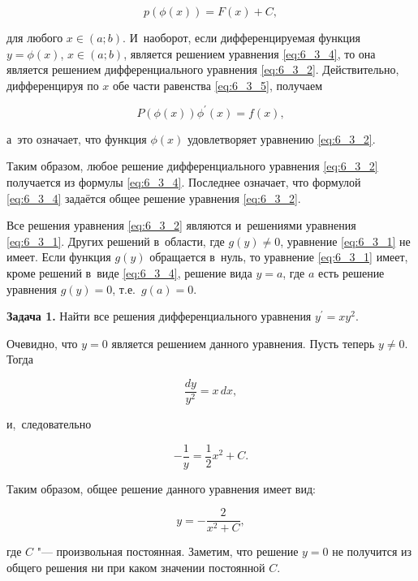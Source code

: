 \begin{equation}\label{eq:6_3_5}
p(\phi(x)) = F(x) + C,
\end{equation}

\noindent
для любого $x \in (a; b)$. И~наоборот, если дифференцируемая функция $y = \phi(x)$,
$x \in (a; b)$, является решением уравнения \eqref{eq:6_3_4}, то она является
решением дифференциального уравнения \eqref{eq:6_3_2}.
Действительно, дифференцируя по $x$ обе части равенства \eqref{eq:6_3_5},
получаем

\begin{equation*}
P(\phi(x)) \phi^\prime(x) = f(x),
\end{equation*}

\noindent
а~это означает, что функция $\phi(x)$ удовлетворяет уравнению \eqref{eq:6_3_2}.

Таким образом, любое решение дифференциального уравнения \eqref{eq:6_3_2} получается
из формулы \eqref{eq:6_3_4}. Последнее означает, что формулой \eqref{eq:6_3_4}
задаётся общее решение уравнения \eqref{eq:6_3_2}.

Все решения уравнения \eqref{eq:6_3_2} являются и~решениями уравнения \eqref{eq:6_3_1}.
Других решений в~области, где $g(y) \ne 0$, уравнение \eqref{eq:6_3_1} не имеет.
Если функция $g(y)$ обращается в~нуль, то уравнение \eqref{eq:6_3_1} имеет,
кроме решений в~виде \eqref{eq:6_3_4}, решение вида $y = a$, где $a$ есть решение
уравнения $g(y) = 0$, т.е.\ $g(a) = 0$.

\textbf{Задача 1.}\label{ex:6_3_1} Найти все решения дифференциального уравнения
$y^\prime = xy^{2}$.

Очевидно, что $y = 0$ является решением данного уравнения. Пусть теперь $y \ne 0$.
Тогда

\begin{equation*}
\dfrac{dy}{y^{2}} = x \, dx,
\end{equation*}

\noindent
и,~следовательно

\begin{equation*}
-\dfrac{1}{y} = \dfrac{1}{2}x^{2} + C.
\end{equation*}

\noindent
Таким образом, общее решение данного уравнения имеет вид:

\begin{equation*}
y = -\dfrac{2}{x^{2} + C},
\end{equation*}

\noindent
где $C$ "--- произвольная постоянная. Заметим, что решение $y = 0$ не получится из
общего решения ни при каком значении постоянной $C$.

